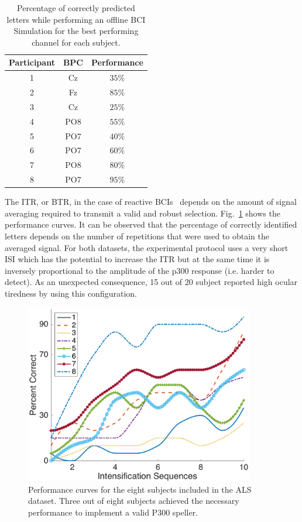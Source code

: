 \documentclass[entropy,article,submit,moreauthors,pdftex,10pt,a4paper]{mdpi}
\begin{document}
\begin{table}[H]
\caption{Percentage of correctly predicted letters while performing an offline BCI Simulation for the best performing channel for each subject.  }
\centering
\begin{tabular}{ccc}
\toprule
\textbf{Participant}	&  \textbf{BPC}	& \textbf{Performance}\\
\midrule
1     &     Cz   &   $35\%$  \\
2     &     Fz   &   $85\%$  \\
3     &     Cz   &   $25\%$  \\
4     &     PO8 &   $55\%$  \\
5     &     PO7 &   $40\%$ \\
6     &     PO7 &   $60\%$  \\
7     &     PO8 &   $80\%$  \\
8     &     PO7 &   $95\%$ \\

\bottomrule
\end{tabular}
\label{tab:results}
\end{table}

The ITR, or BTR, in the case of reactive BCIs~\citep{WolpawJonathanR2012}  depends on the amount of signal averaging required to transmit a valid and robust selection.  Fig.~\ref{fig:performance} shows the performance curves. It can be observed that the percentage of correctly identified letters depends on the number of repetitions that were used to obtain the averaged signal.
For both datasets, the experimental protocol uses a very short ISI which has the potential to increase the ITR but at the same time it is inversely proportional to the amplitude of the p300 response (i.e. harder to detect).  As an unexpected consequence, 15 out of 20 subject reported high ocular tiredness by using this configuration.

\begin{figure}[H]
\centering
\includegraphics[width=10cm]{performance.eps}
\caption{Performance curves for the eight subjects included in the ALS dataset.  Three out of eight subjects achieved the necessary performance to implement a valid P300 speller.}
\label{fig:performance}
\end{figure}
\end{document}
